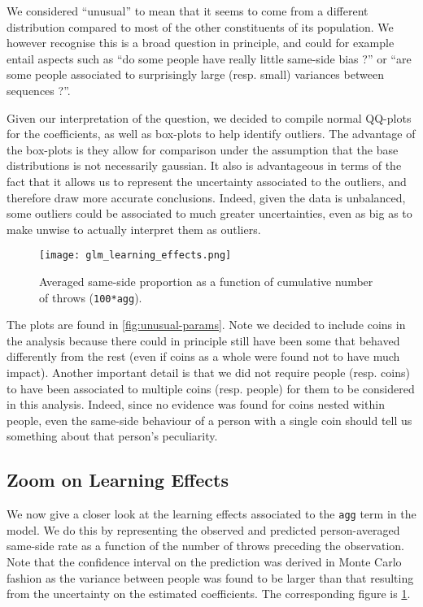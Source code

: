 \documentclass[a4paper, 12pt,oneside]{article}
\begin{document}
		We considered ``unusual'' to mean that it seems to come from a different distribution compared to most of the other constituents of its population. We however recognise this is a broad question in principle, and could for example entail aspects such as ``do some people have really little same-side bias ?'' or ``are some people associated to surprisingly large (resp. small) variances between sequences ?''.

		Given our interpretation of the question, we decided to compile normal QQ-plots for the coefficients, as well as box-plots to help identify outliers. The advantage of the box-plots is they allow for comparison under the assumption that the base distributions is not necessarily gaussian. 
		It also is advantageous in terms of the fact that it allows us to represent the uncertainty associated to the outliers, and therefore draw more accurate conclusions. Indeed, given the data is unbalanced, some outliers could be associated to much greater uncertainties, even as big as to make unwise to actually interpret them as outliers. 
		
		\begin{figure}[htb]
			\centering
			\texttt{[image: glm\_learning\_effects.png]}
			\caption{Averaged same-side proportion as a function of cumulative number of throws (\texttt{100*agg}).}
			\label{fig:learning-effects}
		\end{figure}
		The plots are found in \ref{fig:unusual-params}. Note we decided to include coins in the analysis because there could in principle still have been some that behaved differently from the rest (even if coins as a whole were found not to have much impact). 
		Another important detail is that we did not require people (resp. coins) to have been associated to multiple coins (resp. people) for them to be considered in this analysis. Indeed, since no evidence was found for coins nested within people, even the same-side behaviour of a person with a single coin should tell us something about that person's peculiarity.
		\subsection{Zoom on Learning Effects}
			We now give a closer look at the learning effects associated to the \texttt{agg} term in the model. We do this by representing the observed and predicted person-averaged same-side rate as a function of the number of throws preceding the observation.  Note that the confidence interval on the prediction was derived in Monte Carlo fashion as the variance between people was found to be larger than that resulting from the uncertainty on the estimated coefficients. 
			The corresponding figure is \ref{fig:learning-effects}.
			
\end{document}

